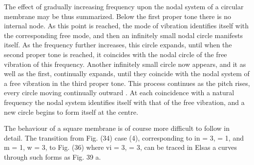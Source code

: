 The effect of gradually increasing frequency upon the nodal system of a
circular membrane may be thus summarized. Below the first proper tone
there is no internal node. As this point is reached, the mode of
vibration identifies itself with the corresponding free mode, and then
an infinitely small nodal circle manifests itself. As the frequency
further increases, this circle expands, until when the second proper
tone is reached, it coincides with the nodal circle of the free
vibration of this frequency. Another infinitely small circle now
appears, and it as well as the first, continually expands, until they
coincide with the nodal system of a free vibration in the third proper
tone. This process continues as the pitch rises, every circle moving
continually outward . At each coincidence with a natural frequency the
nodal system identifies itself with that of the free vibration, and a
new circle begins to form itself at the centre.

The behaviour of a square membrane is of course more difficult to follow
in detail. The transition from Fig. (34) case (4), corresponding to in =
3, = 1, and m = 1, w = 3, to Fig. (36) where vi = 3, = 3, can be
traced in Elsas a curves through such forms as Fig. 39 a.
